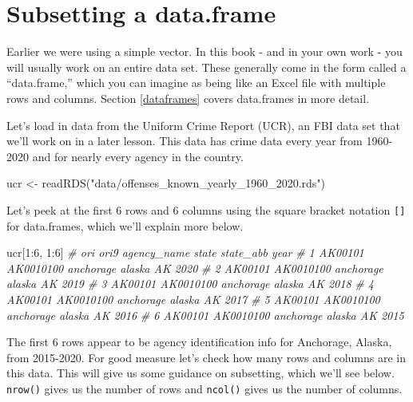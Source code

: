 \documentclass[
]{krantz}
\makeatletter
\newenvironment{Shaded}{\begin{snugshade}}{\end{snugshade}}
\newcommand{\CommentTok}[1]{\textcolor[rgb]{0.37,0.37,0.37}{\textit{#1}}}
\newcommand{\DecValTok}[1]{\textcolor[rgb]{0.06,0.06,0.06}{#1}}
\newcommand{\FunctionTok}[1]{\textcolor[rgb]{0,0,0}{#1}}
\newcommand{\NormalTok}[1]{#1}
\newcommand{\OtherTok}[1]{\textcolor[rgb]{0.37,0.37,0.37}{#1}}
\newcommand{\SpecialCharTok}[1]{\textcolor[rgb]{0,0,0}{#1}}
\newcommand{\StringTok}[1]{\textcolor[rgb]{0.5,0.5,0.5}{#1}}
\newenvironment{kframe}{%
\medskip{}
\setlength{\fboxsep}{.8em}
 \def\at@end@of@kframe{}%
 \ifinner\ifhmode%
  \def\at@end@of@kframe{\end{minipage}}%
  \begin{minipage}{\columnwidth}%
 \fi\fi%
 \def\FrameCommand##1{\hskip\@totalleftmargin \hskip-\fboxsep
 \colorbox{shadecolor}{##1}\hskip-\fboxsep
     \hskip-\linewidth \hskip-\@totalleftmargin \hskip\columnwidth}%
 \MakeFramed {\advance\hsize-\width
   \@totalleftmargin\z@ \linewidth\hsize
   \@setminipage}}%
 {\par\unskip\endMakeFramed%
 \at@end@of@kframe}
\renewenvironment{Shaded}{\begin{kframe}}{\end{kframe}}
\makeatother
\begin{document}
\hypertarget{subsetting-a-data.frame}{%
\section{Subsetting a
data.frame}\label{subsetting-a-data.frame}}

Earlier we were using a simple vector. In this book - and in
your own work - you will usually work on an entire data set.
These generally come in the form called a ``data.frame,''
which you can imagine as being like an Excel file with
multiple rows and columns. Section \ref{dataframes} covers
data.frames in more detail.

Let's load in data from the Uniform Crime Report (UCR), an
FBI data set that we'll work on in a later lesson. This data
has crime data every year from 1960-2020 and for nearly
every agency in the country.

\begin{Shaded}
\begin{Highlighting}[]
\NormalTok{ucr }\OtherTok{\textless{}{-}} \FunctionTok{readRDS}\NormalTok{(}\StringTok{"data/offenses\_known\_yearly\_1960\_2020.rds"}\NormalTok{)}
\end{Highlighting}
\end{Shaded}

Let's peek at the first 6 rows and 6 columns using the
square bracket notation \texttt{{[}{]}} for data.frames,
which we'll explain more below.

\begin{Shaded}
\begin{Highlighting}[]
\NormalTok{ucr[}\DecValTok{1}\SpecialCharTok{:}\DecValTok{6}\NormalTok{, }\DecValTok{1}\SpecialCharTok{:}\DecValTok{6}\NormalTok{]}
\CommentTok{\#       ori      ori9 agency\_name  state state\_abb year}
\CommentTok{\# 1 AK00101 AK0010100   anchorage alaska        AK 2020}
\CommentTok{\# 2 AK00101 AK0010100   anchorage alaska        AK 2019}
\CommentTok{\# 3 AK00101 AK0010100   anchorage alaska        AK 2018}
\CommentTok{\# 4 AK00101 AK0010100   anchorage alaska        AK 2017}
\CommentTok{\# 5 AK00101 AK0010100   anchorage alaska        AK 2016}
\CommentTok{\# 6 AK00101 AK0010100   anchorage alaska        AK 2015}
\end{Highlighting}
\end{Shaded}

The first 6 rows appear to be agency identification info for
Anchorage, Alaska, from 2015-2020. For good measure let's
check how many rows and columns are in this data. This will
give us some guidance on subsetting, which we'll see below.
\texttt{nrow()} gives us the number of rows and
\texttt{ncol()} gives us the number of columns.
\end{document}
